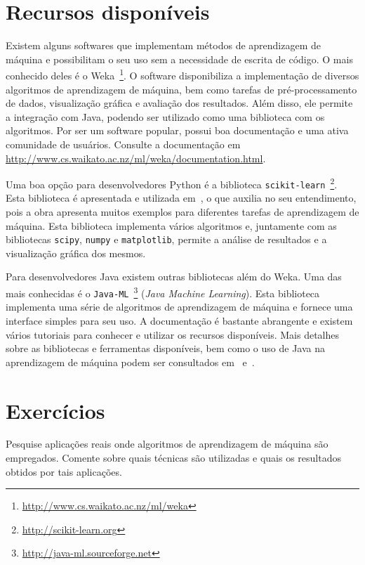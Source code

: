 \section{Recursos disponíveis}

Existem alguns softwares que implementam métodos de aprendizagem de máquina e possibilitam o seu uso sem a necessidade de escrita de código. O mais conhecido deles é o Weka~\footnote{\url{http://www.cs.waikato.ac.nz/ml/weka}}. O software disponibiliza a implementação de diversos algoritmos de aprendizagem de máquina, bem como tarefas de pré-processamento de dados, visualização gráfica e avaliação dos resultados. Além disso, ele permite a integração com Java, podendo ser utilizado como uma biblioteca com os algoritmos. Por ser um software popular, possui boa documentação e uma ativa comunidade de usuários. Consulte a documentação em \url{http://www.cs.waikato.ac.nz/ml/weka/documentation.html}.

Uma boa opção para desenvolvedores Python é a biblioteca \texttt{scikit-learn}~\footnote{\url{http://scikit-learn.org}}. Esta biblioteca é apresentada e utilizada em~\cite{MullerAndGuido2017}, o que auxilia no seu entendimento, pois a obra apresenta muitos exemplos para diferentes tarefas de aprendizagem de máquina. Esta biblioteca implementa vários algoritmos e, juntamente com as bibliotecas \texttt{scipy}, \texttt{numpy} e \texttt{matplotlib}, permite a análise de resultados e a visualização gráfica dos mesmos.

Para desenvolvedores Java existem outras bibliotecas além do Weka. Uma das mais conhecidas é o \texttt{Java-ML}~\footnote{\url{http://java-ml.sourceforge.net}} (\textit{Java Machine Learning}). Esta biblioteca implementa uma série de algoritmos de aprendizagem de máquina e fornece uma interface simples para seu uso. A documentação é bastante abrangente e existem vários tutoriais para conhecer e utilizar os recursos disponíveis. Mais detalhes sobre as bibliotecas e ferramentas disponíveis, bem como o uso de Java na aprendizagem de máquina podem ser consultados em~\cite{Kaluza2016} e~\cite{KamathAndChoppella2017}.

\section{Exercícios}

\resetexercisenumbering

\begin{exercise}
Pesquise aplicações reais onde algoritmos de aprendizagem de máquina são empregados. Comente sobre quais técnicas são utilizadas e quais os resultados obtidos por tais aplicações.
\end{exercise}

